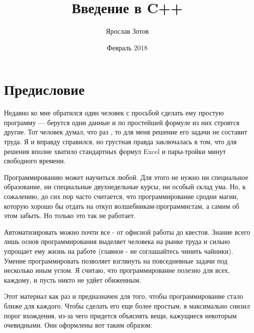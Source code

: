 \documentclass{article}
\begin{document}
\fontsize{14}{16pt}\selectfont  %
\title{Введение в C++}
\author{Ярослав Зотов}
\date{Февраль 2018}

\newcommand{\fordummies}[1]{
\begin{snugshade*}
#1
\end{snugshade*}
} %


\section{Предисловие}

Недавно ко мне обратился один человек с просьбой сделать ему простую программу --- берутся одни данные и по простейшей формуле из них строятся другие. Тот человек думал, что раз \grqq, то для меня решение его задачи не составит труда. Я и вправду справился, но грустная правда  заключалась в том, что для решения вполне хватило стандартных формул Excel и пары-тройки минут свободного времени.

Программированию может научиться любой. Для этого не нужно ни специальное образование, ни специальные двухнедельные курсы, ни особый склад ума. Но, к сожалению, до сих пор часто считается, что программирование сродни магии, которую хорошо бы отдать на откуп волшебникам-программистам, а самим об этом забыть. Но только это так не работает. 

Автоматизировать можно почти все - от офисной работы до квестов. Знание всего лишь основ программирования выделяет человека на рынке труда и сильно упрощает ему жизнь на работе (главное - не соглашайтесь чинить чайники). Умение программировать позволяет взглянуть на повседневные задачи под несколько иным углом. Я считаю, что программирование полезно для всех, каждому, и пусть никто не удйет обиженным.

Этот материал как раз и предназначен для того, чтобы программирование стало ближе для каждого. Чтобы сделать его еще более простым, я максимально снизил порог вхождения, из-за чего придется объяснять вещи, кажущиеся некоторым очевидными. Они оформлены вот таким образом:
\end{document}
